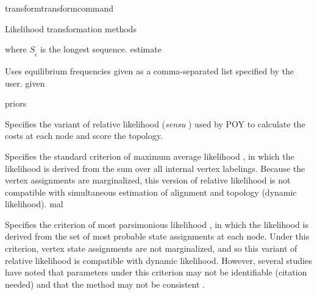 \begin{command}{transform}{transformcommand}
\begin{arguments}
\begin{argumentgroup}{Likelihood transformation methods}
{\begin{description}
{                             where
                            $S_{\hat{i}}$ is the longest sequence.}
                            {estimate}

                            {Uses equilibrium frequencies given as a
                            comma-separated list specified by the user.}
                            {given}

                    \end{description}}
                {priors}

                    {Specifies the variant of relative likelihood (\textit{sensu}
                    \cite{steel2000parsimony}) used by POY to calculate the costs at
                    each node and score the topology.

                    \begin{description}

                            {Specifies the standard criterion of maximum average
                            likelihood \cite{felsenstein1981}, in which the
                            likelihood is derived from the sum over all internal
                            vertex labelings. Because the vertex assignments are
                            marginalized, this version of relative likelihood is not
                            compatible with simultaneous estimation of alignment and
                            topology (dynamic likelihood).}
                            {mal}

                            {Specifies the criterion of most parsimonious likelihood
                            \cite{barryandhartigan1987}, in which the likelihood is
                            derived from the set of most probable state assignments
                            at each node. Under this criterion, vertex state
                            assignments are not marginalized, and so this variant of
                            relative likelihood is compatible with dynamic
                            likelihood. However, several studies have noted that
                            parameters under this criterion may not be identifiable
                            (citation needed) and that the method may not be consistent
                            \cite[for example]{mossel2009shrinkage}.
   
}
\end{description}}
\end{argumentgroup}
\end{arguments}
\end{command}
